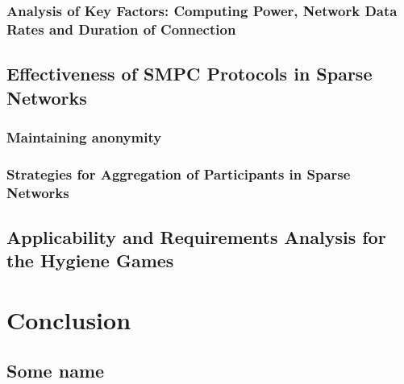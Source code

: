 	\subsection*{Analysis of Key Factors: Computing Power, Network Data Rates and Duration of Connection}
	\section{Effectiveness of SMPC Protocols in Sparse Networks}
	\subsection*{Maintaining anonymity}
	\subsection*{Strategies for Aggregation of Participants in Sparse Networks}
	\section{Applicability and Requirements Analysis for the Hygiene Games}

\chapter{Conclusion}

\clearpage
\renewcommand{\bibname}{References} %
\printbibliography[heading=bibintoc] %

\begin{appendices}
	\chapter{Some name}
	\lipsum[3]
\end{appendices}


